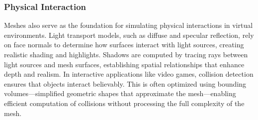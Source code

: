 \subsubsection{Physical Interaction}

Meshes also serve as the foundation for simulating physical interactions in virtual environments. Light transport models, such as diffuse and specular reflection, rely on face normals to determine how surfaces interact with light sources, creating realistic shading and highlights. Shadows are computed by tracing rays between light sources and mesh surfaces, establishing spatial relationships that enhance depth and realism. In interactive applications like video games, collision detection ensures that objects interact believably. This is often optimized using bounding volumes—simplified geometric shapes that approximate the mesh—enabling efficient computation of collisions without processing the full complexity of the mesh.